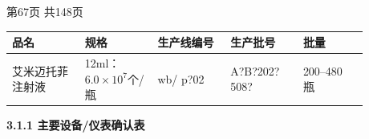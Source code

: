 \documentclass[UTF8,10pt,a4paper,fontset=fandol]{ctexart}
\newcommand{\fieldvalue}[1]{#1}
\newcommand{\handwritten}[1]{#1}
\begin{document}
\medskip

\begin{center}
第67页 共148页
\end{center}

\newpage

\noindent
\begin{tabular}{|p{0.18\linewidth}|p{0.18\linewidth}|p{0.18\linewidth}|p{0.18\linewidth}|p{0.16\linewidth}|}
\hline
品名 & 规格 & 生产线编号 & 生产批号 & 批量 \\
\hline
艾米迈托菲注射液 & 12ml：$6.0\times10^7$个/瓶 &
\fieldvalue{\handwritten{wb/ p?02}} &
\fieldvalue{\handwritten{A?B?202?508?}} &
200--480 瓶 \\
\hline
\end{tabular}

\vspace{0.5em}
\noindent\textbf{3.1.1 主要设备/仪表确认表}
\end{document}
